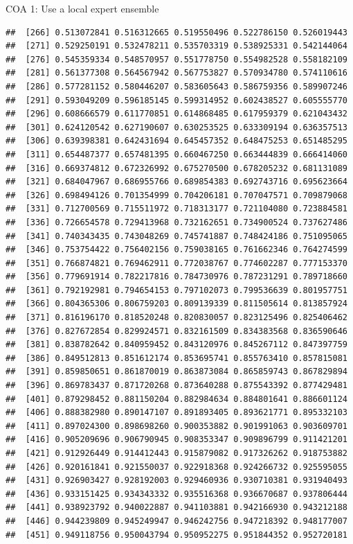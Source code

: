 \documentclass[ignorenonframetext,]{beamer}
\begin{document}
\begin{frame}[fragile]{COA 1: Use a local expert ensemble}
\begin{verbatim}
##  [266] 0.513072841 0.516312665 0.519550496 0.522786150 0.526019443
##  [271] 0.529250191 0.532478211 0.535703319 0.538925331 0.542144064
##  [276] 0.545359334 0.548570957 0.551778750 0.554982528 0.558182109
##  [281] 0.561377308 0.564567942 0.567753827 0.570934780 0.574110616
##  [286] 0.577281152 0.580446207 0.583605643 0.586759356 0.589907246
##  [291] 0.593049209 0.596185145 0.599314952 0.602438527 0.605555770
##  [296] 0.608666579 0.611770851 0.614868485 0.617959379 0.621043432
##  [301] 0.624120542 0.627190607 0.630253525 0.633309194 0.636357513
##  [306] 0.639398381 0.642431694 0.645457352 0.648475253 0.651485295
##  [311] 0.654487377 0.657481395 0.660467250 0.663444839 0.666414060
##  [316] 0.669374812 0.672326992 0.675270500 0.678205232 0.681131089
##  [321] 0.684047967 0.686955766 0.689854383 0.692743716 0.695623664
##  [326] 0.698494126 0.701354999 0.704206181 0.707047571 0.709879068
##  [331] 0.712700569 0.715511972 0.718313177 0.721104080 0.723884581
##  [336] 0.726654578 0.729413968 0.732162651 0.734900524 0.737627486
##  [341] 0.740343435 0.743048269 0.745741887 0.748424186 0.751095065
##  [346] 0.753754422 0.756402156 0.759038165 0.761662346 0.764274599
##  [351] 0.766874821 0.769462911 0.772038767 0.774602287 0.777153370
##  [356] 0.779691914 0.782217816 0.784730976 0.787231291 0.789718660
##  [361] 0.792192981 0.794654153 0.797102073 0.799536639 0.801957751
##  [366] 0.804365306 0.806759203 0.809139339 0.811505614 0.813857924
##  [371] 0.816196170 0.818520248 0.820830057 0.823125496 0.825406462
##  [376] 0.827672854 0.829924571 0.832161509 0.834383568 0.836590646
##  [381] 0.838782642 0.840959452 0.843120976 0.845267112 0.847397759
##  [386] 0.849512813 0.851612174 0.853695741 0.855763410 0.857815081
##  [391] 0.859850651 0.861870019 0.863873084 0.865859743 0.867829894
##  [396] 0.869783437 0.871720268 0.873640288 0.875543392 0.877429481
##  [401] 0.879298452 0.881150204 0.882984634 0.884801641 0.886601124
##  [406] 0.888382980 0.890147107 0.891893405 0.893621771 0.895332103
##  [411] 0.897024300 0.898698260 0.900353882 0.901991063 0.903609701
##  [416] 0.905209696 0.906790945 0.908353347 0.909896799 0.911421201
##  [421] 0.912926449 0.914412443 0.915879082 0.917326262 0.918753882
##  [426] 0.920161841 0.921550037 0.922918368 0.924266732 0.925595055
##  [431] 0.926903427 0.928192003 0.929460936 0.930710381 0.931940493
##  [436] 0.933151425 0.934343332 0.935516368 0.936670687 0.937806444
##  [441] 0.938923792 0.940022887 0.941103881 0.942166930 0.943212188
##  [446] 0.944239809 0.945249947 0.946242756 0.947218392 0.948177007
##  [451] 0.949118756 0.950043794 0.950952275 0.951844352 0.952720181

\end{verbatim}
\end{frame}
\end{document}

